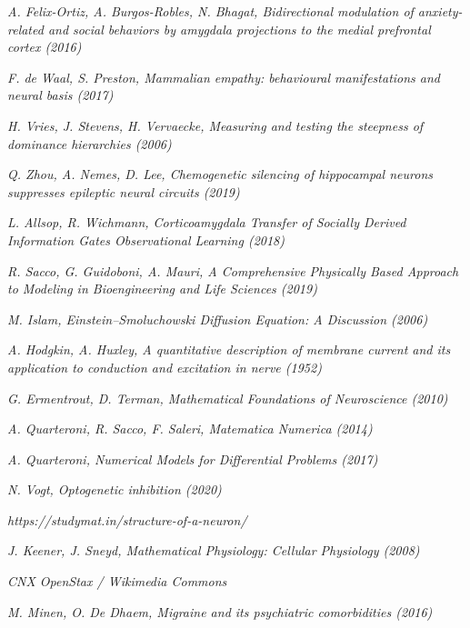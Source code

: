 \documentclass[12pt, a4paper]{report}
\begin{document}
\begin{thebibliography}{50}
	\textit{A. Felix-Ortiz, A. Burgos-Robles, N. Bhagat, Bidirectional modulation of anxiety-related and social behaviors by amygdala projections to the medial prefrontal cortex  (2016)}
	
	\textit{F. de Waal, S. Preston, Mammalian empathy: behavioural manifestations and neural basis (2017)}
	
	\textit{H. Vries, J. Stevens, H. Vervaecke, Measuring and testing the steepness of dominance hierarchies (2006)}
	
	\textit{Q. Zhou, A. Nemes, D. Lee, Chemogenetic silencing of hippocampal neurons suppresses epileptic neural circuits (2019)}
	
	\textit{L. Allsop, R. Wichmann, Corticoamygdala Transfer of Socially Derived Information Gates Observational Learning (2018)}
	
	\textit{R. Sacco, G. Guidoboni, A. Mauri, A Comprehensive Physically Based Approach to Modeling in Bioengineering and Life Sciences (2019)}
	
	\textit{M. Islam, Einstein–Smoluchowski Diffusion Equation: A Discussion (2006)}
	
	\textit{A. Hodgkin, A. Huxley, A quantitative description of membrane current and its application to conduction 
		and excitation in nerve (1952)}
	
	\textit{G. Ermentrout, D. Terman, Mathematical Foundations of Neuroscience (2010)}
	
	\textit{A. Quarteroni, R. Sacco, F. Saleri, Matematica Numerica (2014)}
	
	\textit{A. Quarteroni, Numerical Models for Differential Problems (2017)}
	
	\textit{N. Vogt, Optogenetic inhibition (2020)}
	
	\textit{https://studymat.in/structure-of-a-neuron/}
	
	\textit{J. Keener, J. Sneyd, Mathematical Physiology: Cellular Physiology (2008)}
	
	\textit{CNX OpenStax / Wikimedia Commons}
	
	\textit{M. Minen, O. De Dhaem, Migraine and its psychiatric comorbidities (2016)}
	

	
\end{thebibliography}
\end{document}
